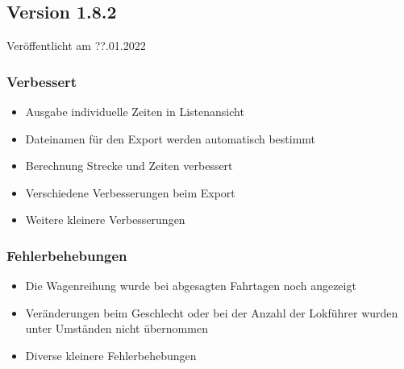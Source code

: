 \begin{neu}
\subsection{Version 1.8.2}
\label{version:1:8:2}
Veröffentlicht am ??.01.2022
\subsubsection{Verbessert}
\begin{itemize}
  \item
  Ausgabe individuelle Zeiten in Listenansicht
  \item
  Dateinamen für den Export werden automatisch bestimmt
  \item
  Berechnung Strecke und Zeiten verbessert
  \item
  Verschiedene Verbesserungen beim Export
  \item
  Weitere kleinere Verbesserungen
\end{itemize}

\subsubsection{Fehlerbehebungen}
\begin{itemize}
  \item
  Die Wagenreihung wurde bei abgesagten Fahrtagen noch angezeigt
  \item
  Veränderungen beim Geschlecht oder bei der Anzahl der Lokführer wurden unter Umständen nicht übernommen
  \item
  Diverse kleinere Fehlerbehebungen
\end{itemize}
\end{neu}
